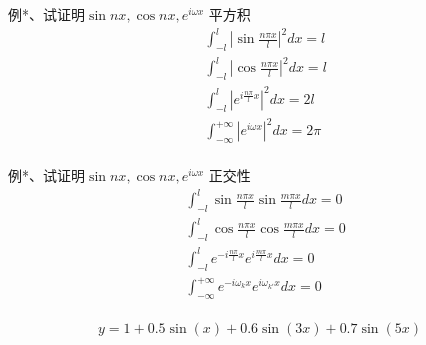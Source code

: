 \begin{frame}
    \begin{exampleblock} {例*、试证明$\sin nx, \cos nx, e^{i\omega x}$  平方积}
    ~~\\
    \[ \begin{aligned}
            &\int_{-l} ^{l} \left| \sin \frac{n\pi x}{l} \right|^2 dx = l \\
            &\int_{-l} ^{l} \left| \cos \frac{n\pi x}{l} \right|^2 dx = l \\
            &\int_{-l} ^{l} \left| e^{i \frac{n\pi}{l} x} \right|^2  dx = 2l \\
            &\int_{-\infty} ^{+\infty} \left| e^{i \omega x} \right|^2  dx = 2\pi \\
    \end{aligned}\]
    \end{exampleblock}	
\end{frame}

\begin{frame}
    \begin{exampleblock} {例*、试证明$\sin nx, \cos nx, e^{i\omega x}$  正交性}
    ~~\\
    \[ \begin{aligned}
            &\int_{-l} ^{l} \sin \frac{n\pi x}{l} \sin \frac{m\pi x}{l}  dx = 0 \\
            &\int_{-l} ^{l} \cos \frac{n\pi x}{l} \cos \frac{m\pi x}{l}  dx = 0 \\
            &\int_{-l} ^{l} e^{-i \frac{n\pi}{l} x} e^{i \frac{m\pi}{l} x}   dx = 0 \\
            &\int_{-\infty} ^{+\infty}  e^{-i \omega_k x} e^{i \omega_{k'} x}   dx = 0 \\
    \end{aligned}\]
    \end{exampleblock}	
\end{frame}

\begin{frame}
	\begin{equation*}
		y=1 + 0.5\sin(x)+0.6\sin(3x)+0.7\sin(5x)
	\end{equation*}    
\end{frame}

